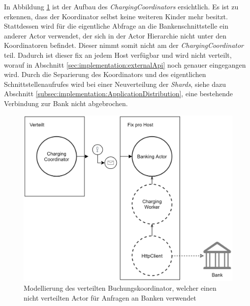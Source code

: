 In Abbildung \ref{fig:implementation:ChargingCoordinatorSample} ist der Aufbau des \textit{ChargingCoordinators} ersichtlich. Es ist zu erkennen, dass der Koordinator selbst keine weiteren Kinder mehr besitzt. Stattdessen wird für die eigentliche Abfrage an die Bankenschnittstelle ein anderer Actor verwendet, der sich in der Actor Hierarchie nicht unter den Koordinatoren befindet. Dieser nimmt somit nicht am  der \textit{ChargingCoordinator} teil. Dadurch ist dieser fix an jedem Host verfügbar und wird nicht verteilt, worauf in Abschnitt \ref{sec:implementation:externalApi} noch genauer eingegangen wird. Durch die Separierung des Koordinators und des eigentlichen Schnittstellenaufrufes wird bei einer Neuverteilung der \textit{Shards}, siehe dazu Abschnitt \ref{subsec:implementation:ApplicationDistribution}, eine bestehende Verbindung zur Bank nicht abgebrochen. 
\begin{figure}
  \centering
  \includegraphics[width=0.65\linewidth]{gfx/implementation/ChargingCoordinatorSample}
  \caption{Modellierung des verteilten Buchungskoordinator, welcher einen nicht verteilten Actor für Anfragen an Banken verwendet}
  \label{fig:implementation:ChargingCoordinatorSample}
\end{figure}


